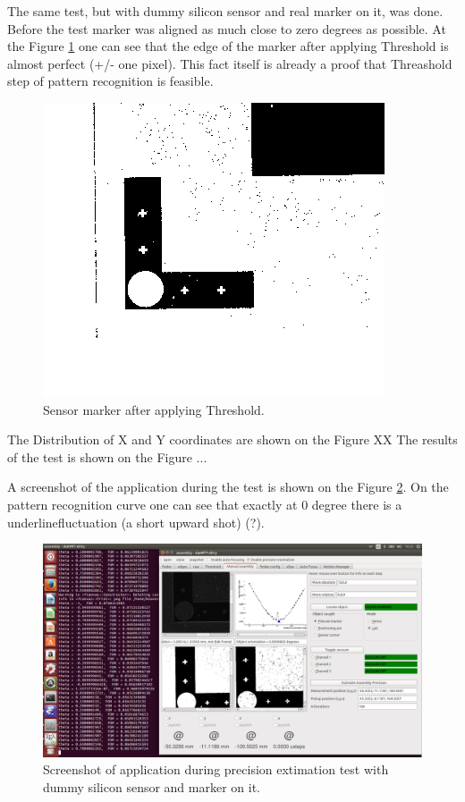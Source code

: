 The same test, but with dummy silicon sensor and real marker on it, was done. Before the test marker was aligned as much close to zero degrees as possible. At the Figure \ref{fig:thresholded_marker} one can see that the edge of the marker after applying Threshold is almost perfect (+/- one pixel). This fact itself is already a proof that Threashold step of pattern recognition is feasible.

\begin{figure}[ht]\centering
\includegraphics[width=0.8\linewidth]{Data/Precision_tests/Thresholded_marker.png}
\caption{Sensor marker after applying Threshold.}
\label{fig:thresholded_marker}
\end{figure}

The Distribution of X and Y coordinates are shown on the Figure XX
The results of the test is shown on the Figure ...





A screenshot of the application during the test is shown on the Figure \ref{fig:marker_pattern_recognition_screenshot}. On the pattern recognition curve one can see that exactly at 0 degree there is a underline{fluctuation (a short upward shot) (?)}. 

\begin{figure}[ht]\centering
\includegraphics[width=0.8\linewidth]{Data/Precision_tests/Marker_pattern_recognition_screenshot.png}
\caption{Screenshot of application during precision extimation test with dummy silicon sensor and marker on it.}
\label{fig:marker_pattern_recognition_screenshot}
\end{figure}


